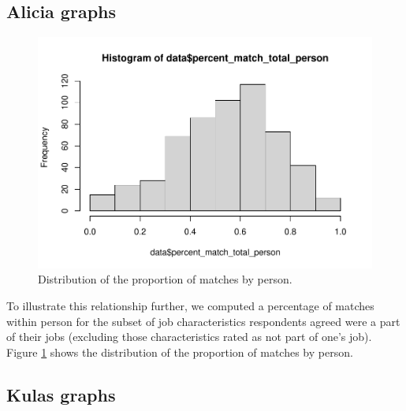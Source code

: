\documentclass[
  man]{apa6}
\begin{document}
\hypertarget{alicia-graphs}{%
\subsection{Alicia graphs}\label{alicia-graphs}}

\begin{figure}
\centering
\includegraphics{Submission_ResourceCount_files/figure-latex/matchpercentsbyperson-1.pdf}
\caption{\label{fig:matchpercentsbyperson}Distribution of the proportion of matches by person.}
\end{figure}

To illustrate this relationship further, we computed a percentage of matches within person for the subset of job characteristics respondents agreed were a part of their jobs (excluding those characteristics rated as not part of one's job). Figure \ref{fig:matchpercentsbyperson} shows the distribution of the proportion of matches by person.

\hypertarget{kulas-graphs}{%
\subsection{Kulas graphs}\label{kulas-graphs}}
\end{document}
